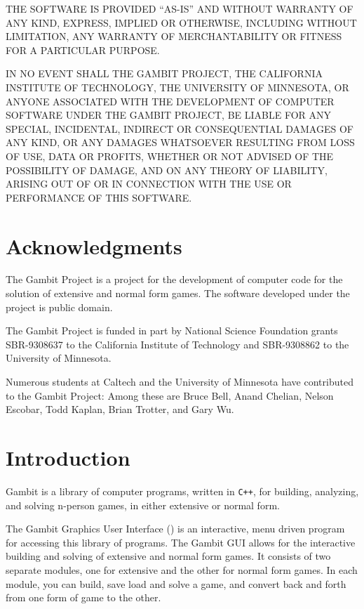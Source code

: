 THE SOFTWARE IS PROVIDED ``AS-IS'' AND WITHOUT WARRANTY OF ANY KIND, EXPRESS, IMPLIED OR 
OTHERWISE, INCLUDING WITHOUT LIMITATION, ANY WARRANTY OF MERCHANTABILITY OR FITNESS FOR A 
PARTICULAR PURPOSE.
 
IN NO EVENT SHALL THE GAMBIT PROJECT, THE CALIFORNIA INSTITUTE OF TECHNOLOGY, THE UNIVERSITY 
OF MINNESOTA, OR ANYONE ASSOCIATED WITH THE DEVELOPMENT OF COMPUTER SOFTWARE UNDER THE GAMBIT 
PROJECT, BE LIABLE FOR ANY SPECIAL, INCIDENTAL, INDIRECT OR CONSEQUENTIAL DAMAGES OF ANY KIND, 
OR ANY DAMAGES WHATSOEVER RESULTING FROM LOSS OF USE, DATA OR PROFITS, WHETHER OR NOT ADVISED 
OF THE POSSIBILITY OF DAMAGE, AND ON ANY THEORY OF LIABILITY, ARISING OUT OF OR IN CONNECTION 
WITH THE USE OR PERFORMANCE OF THIS SOFTWARE.


\chapter*{Acknowledgments}%

The Gambit Project is a project for the development of computer code for the 
solution of extensive and normal form games.  The software developed under 
the project is public domain.  

The Gambit Project is funded in part by 
National Science Foundation grants SBR-9308637 to the California Institute 
of Technology and SBR-9308862 to the University of Minnesota.  

Numerous students at Caltech and the University of Minnesota have contributed
 to the Gambit Project:  Among these are Bruce Bell,  Anand Chelian, Nelson 
Escobar, Todd Kaplan, Brian Trotter, and Gary Wu. 

\chapter{Introduction} 
Gambit is a library of computer programs, written
in \verb$C++$, for building, analyzing, and solving n-person games, in
either extensive or normal form.

The Gambit Graphics User Interface () is an
interactive, menu driven program for accessing this library of programs.
The Gambit GUI allows for the interactive building and solving of
extensive and normal form games.  It consists of two separate modules, one
for extensive and the other for normal form games.   In each module, you
can build, save load and solve a game, and convert back and forth from one
form of game to the other.

